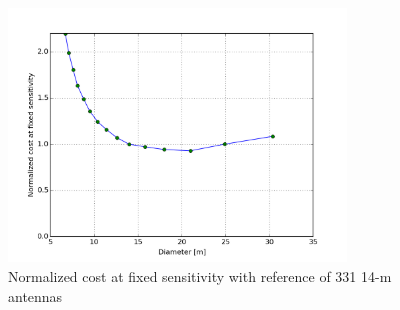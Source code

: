 \documentclass[11pt]{article}
\begin{document}
\begin{figure}[h]
\centering
\includegraphics[width=0.8\textwidth]{normcostfunc.png}
\caption{Normalized cost at fixed sensitivity with reference of 331 14-m antennas}
\label{fig:normcost}
\end{figure}



\end{document}
